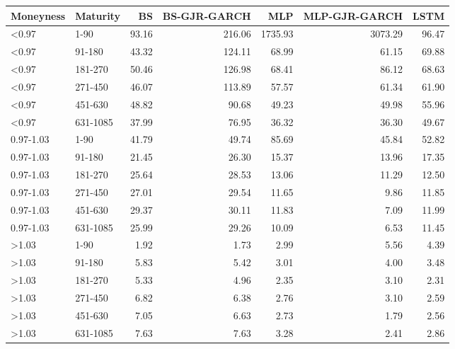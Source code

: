 \begin{tabular}{llrrrrr}
\toprule
Moneyness & Maturity & BS & BS-GJR-GARCH & MLP & MLP-GJR-GARCH & LSTM \\
\midrule
<0.97 & 1-90 & 93.16 & 216.06 & 1735.93 & 3073.29 & 96.47 \\
<0.97 & 91-180 & 43.32 & 124.11 & 68.99 & 61.15 & 69.88 \\
<0.97 & 181-270 & 50.46 & 126.98 & 68.41 & 86.12 & 68.63 \\
<0.97 & 271-450 & 46.07 & 113.89 & 57.57 & 61.34 & 61.90 \\
<0.97 & 451-630 & 48.82 & 90.68 & 49.23 & 49.98 & 55.96 \\
<0.97 & 631-1085 & 37.99 & 76.95 & 36.32 & 36.30 & 49.67 \\
0.97-1.03 & 1-90 & 41.79 & 49.74 & 85.69 & 45.84 & 52.82 \\
0.97-1.03 & 91-180 & 21.45 & 26.30 & 15.37 & 13.96 & 17.35 \\
0.97-1.03 & 181-270 & 25.64 & 28.53 & 13.06 & 11.29 & 12.50 \\
0.97-1.03 & 271-450 & 27.01 & 29.54 & 11.65 & 9.86 & 11.85 \\
0.97-1.03 & 451-630 & 29.37 & 30.11 & 11.83 & 7.09 & 11.99 \\
0.97-1.03 & 631-1085 & 25.99 & 29.26 & 10.09 & 6.53 & 11.45 \\
>1.03 & 1-90 & 1.92 & 1.73 & 2.99 & 5.56 & 4.39 \\
>1.03 & 91-180 & 5.83 & 5.42 & 3.01 & 4.00 & 3.48 \\
>1.03 & 181-270 & 5.33 & 4.96 & 2.35 & 3.10 & 2.31 \\
>1.03 & 271-450 & 6.82 & 6.38 & 2.76 & 3.10 & 2.59 \\
>1.03 & 451-630 & 7.05 & 6.63 & 2.73 & 1.79 & 2.56 \\
>1.03 & 631-1085 & 7.63 & 7.63 & 3.28 & 2.41 & 2.86 \\
\bottomrule
\end{tabular}

